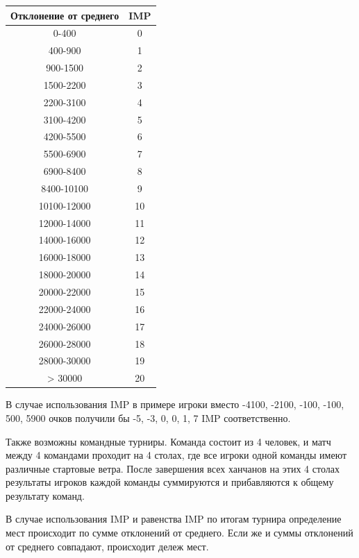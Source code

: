 \begin{additional}
\begin{tabular}{|c|c|}
	\hline
	Отклонение от среднего & IMP \\
	\hline
	0-400 & 0 \\
	\hline
	400-900 & 1 \\
	\hline
	900-1500 & 2 \\
	\hline
	1500-2200 & 3 \\
	\hline
	2200-3100 & 4 \\
	\hline
	3100-4200 & 5 \\
	\hline
	4200-5500 & 6 \\
	\hline
	5500-6900 & 7 \\
	\hline
	6900-8400 & 8 \\
	\hline
	8400-10100 & 9 \\
	\hline
	10100-12000 & 10 \\
	\hline
	12000-14000 & 11 \\
	\hline
	14000-16000 & 12 \\
	\hline
	16000-18000 & 13 \\
	\hline
	18000-20000 & 14 \\
	\hline
	20000-22000 & 15 \\
	\hline
	22000-24000 & 16 \\
	\hline
	24000-26000 & 17 \\
	\hline
	26000-28000 & 18 \\
	\hline
	28000-30000 & 19 \\
	\hline
	> 30000 & 20 \\
	\hline
\end{tabular}

\vspace{0.3cm}

В случае использования IMP в примере игроки вместо -4100, -2100, -100, -100, 500, 5900 очков получили бы -5, -3, 0, 0, 1, 7 IMP соответственно.

\vspace{0.3cm}

Также возможны командные турниры. Команда состоит из 4 человек, и матч между 4 командами проходит на 4 столах, где все игроки одной команды имеют различные стартовые ветра. После завершения всех ханчанов на этих 4 столах результаты игроков каждой команды суммируются и прибавляются к общему результату команд.

\vspace{0.3cm}

В случае использования IMP и равенства IMP по итогам турнира определение мест происходит по сумме отклонений от среднего. Если же и суммы отклонений от среднего совпадают, происходит дележ мест.


\end{additional}
